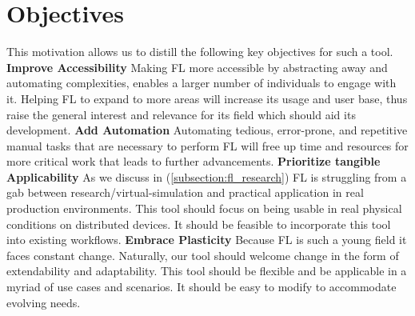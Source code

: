 \section{Objectives}

This motivation allows us to distill the following key objectives for such a tool.
\vspace{5mm}
\newline
\textbf{Improve Accessibility}\newline
Making FL more accessible by abstracting away and automating complexities,
enables a larger number of individuals to engage with it.
Helping FL to expand to more areas will increase its usage and user base,
thus raise the general interest and relevance for its field which should aid its development.
\vspace{5mm}
\newline
\textbf{Add Automation}\newline
Automating tedious, error-prone, and repetitive manual tasks that are necessary
to perform FL will free up time and resources for more critical work that leads
to further advancements.
\vspace{5mm}
\newline
\textbf{Prioritize tangible Applicability}\newline
As we discuss in (\ref{subsection:fl_research}) FL is struggling from a gab
between research/virtual-simulation and practical application in real production environments.
This tool should focus on being usable in real physical conditions on distributed devices.
It should be feasible to incorporate this tool into existing workflows.
\vspace{5mm}
\newline
\textbf{Embrace Plasticity}\newline
Because FL is such a young field it faces constant change.
Naturally, our tool should welcome change in the form of extendability
and adaptability.
This tool should be flexible and be applicable in a myriad of use cases and scenarios.
It should be easy to modify to accommodate evolving needs.